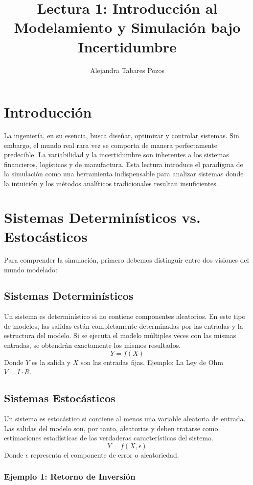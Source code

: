 \documentclass[11pt, letterpaper]{article}
\title{Lectura 1: Introducción al Modelamiento y Simulación bajo Incertidumbre}
\author{Alejandra Tabares Pozos}
\date{}
\begin{document}
\maketitle
\tableofcontents
\newpage

\section{Introducción}
La ingeniería, en su esencia, busca diseñar, optimizar y controlar sistemas. Sin embargo, el mundo real rara vez se comporta de manera perfectamente predecible. La variabilidad y la incertidumbre son inherentes a los sistemas financieros, logísticos y de manufactura. Esta lectura introduce el paradigma de la simulación como una herramienta indispensable para analizar sistemas donde la intuición y los métodos analíticos tradicionales resultan insuficientes.

\section{Sistemas Determinísticos vs. Estocásticos}

Para comprender la simulación, primero debemos distinguir entre dos visiones del mundo modelado:

\subsection{Sistemas Determinísticos}
Un sistema es determinístico si no contiene componentes aleatorios. En este tipo de modelos, las salidas están completamente determinadas por las entradas y la estructura del modelo. Si se ejecuta el modelo múltiples veces con las mismas entradas, se obtendrán exactamente los mismos resultados.
\[ Y = f(X) \]
Donde $Y$ es la salida y $X$ son las entradas fijas. Ejemplo: La Ley de Ohm $V = I \cdot R$.

\subsection{Sistemas Estocásticos}
Un sistema es estocástico si contiene al menos una variable aleatoria de entrada. Las salidas del modelo son, por tanto, aleatorias y deben tratarse como estimaciones estadísticas de las verdaderas características del sistema.
\[ Y = f(X, \epsilon) \]
Donde $\epsilon$ representa el componente de error o aleatoriedad.

\subsubsection{Ejemplo 1: Retorno de Inversión}
\end{document}
